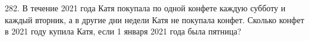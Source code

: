 282. В течение 2021 года Катя покупала по одной конфете каждую субботу и каждый вторник, а в другие дни недели Катя не покупала конфет. Сколько конфет в 2021 году купила Катя, если 1 января 2021 года была пятница?\\
